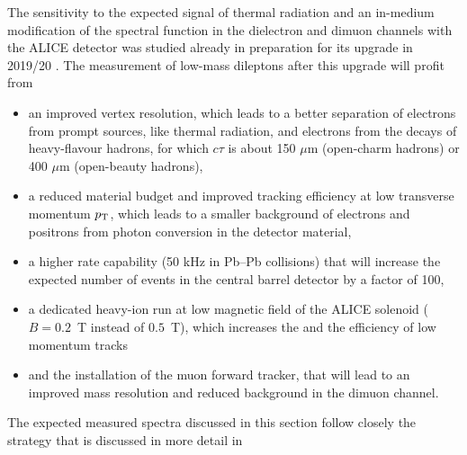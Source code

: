 \documentclass[../report.tex]{subfiles}
\begin{document}
The sensitivity to the expected signal of thermal radiation and an in-medium modification of the \Prho spectral function in the dielectron and dimuon channels with the ALICE detector \cite{generalALICEreferences} was studied already in preparation for its upgrade in 2019/20 \cite{Abelevetal:2014cna,Abelevetal:2014dna,ALICE:2014qrd,ALICE:MFTLoI}. The measurement of low-mass dileptons after this upgrade will profit from  
\begin{itemize}
\item an improved vertex resolution, which leads to a better separation of electrons from prompt sources, like thermal radiation, and electrons from the decays of heavy-flavour hadrons, for which $c\tau$ is about 150 $\mu$m (open-charm hadrons) or 400 $\mu$m (open-beauty hadrons), 
\item a reduced material budget and improved tracking efficiency at low transverse momentum $p_{\rm T}$, which leads to a smaller background of electrons and positrons from photon conversion in the detector material,
\item a higher rate capability (50 kHz in Pb--Pb collisions) that will increase the expected number of events in the central barrel detector by a factor of 100, 
\item a dedicated heavy-ion run at low magnetic field of the ALICE solenoid ($B=0.2$~T instead of $0.5$~T), which increases the  and the efficiency of low momentum tracks 
\item and the installation of the muon forward tracker, that will lead to an improved mass resolution and reduced background in the dimuon channel.
\end{itemize}
The expected measured spectra discussed in this section follow closely the strategy that is discussed in more detail in \cite{Abelevetal:2014cna,Abelevetal:2014dna,ALICE:2014qrd,ALICE:MFTLoI}
\end{document}
